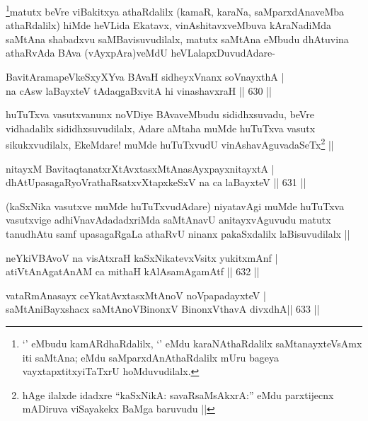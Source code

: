 \begin{artha}
\footnote{`\stext' eMbudu kamARdhaRdalilx, `\stext' eMdu karaNAthaRdalilx saMtanayxteV\s sAmx iti saMtAna; eMdu saMparxdAnAthaRdalilx mUru bageya vayxtapxtitxyiTaTxrU hoMduvudilalx.}matutx beVre viBakitxya athaRdalilx (kamaR, karaNa, saMparxdAnaveMba athaRdalilx) hiMde heVLida Ekatavx, vinAshitavxveMbuva kAraNadiMda saMtAna shabadxvu saMBavisuvudilalx, matutx saMtAna eMbudu dhAtuvina athaRvAda BAva (vAyxpAra)veMdU heVLalapxDuvudAdare-
\end{artha}

\begin{shl}
BavitAramapeVkeSxyXYva BAvaH sidheyxVnanx soV\s nayxthA | \\
na cAsw laBayxteV tAdaqgaBxvitA hi vinashavxraH \hfill||  630 ||  
\end{shl}

\begin{artha}
huTuTxva vasutxvanunx noVDiye BAvaveMbudu sididhxsuvadu, beVre vidhadalilx sididhxsuvudilalx, Adare aMtaha muMde huTuTxva vasutx sikukxvudilalx, EkeMdare! muMde huTuTxvudU vinAshavAguvadaSeTx\footnote{hAge ilalxde idadxre ``kaSxNikA: savaRsaMsAkxrA:'' eMdu parxtijecnx mADiruva viSayakekx BaMga baruvudu ||} ||
\end{artha}

\begin{shl}
nitayxM BavitaqtanatxrXtAvxtasxMtAnasAyxpayxnitayxtA | \\
dhAtUpasagaRyoVrathaRsatxvXtapxkeSxV na ca laBayxteV \hfill||  631 ||  
\end{shl}

\begin{artha}
(kaSxNika vasutxve muMde huTuTxvudAdare) niyatavAgi muMde huTuTxva vasutxvige adhiVnavAdadadxriMda saMtAnavU anitayxvAguvudu matutx tanudhAtu samf upasagaRgaLa athaRvU ninanx pakaSxdalilx laBisuvudilalx ||
\end{artha}


\begin{shl}
neYkiVBAvoV na visAtxraH kaSxNikatevxV\s sitx yukitxmAnf | \\
atiVtAnAgatAnAM ca mithaH kAlAsamAgamAtf \hfill||  632 ||  
\end{shl}
				
\begin{shl}
vataRmAnasayx ceYkatAvxtasxMtAnoV noVpapadayxteV | \\
saMtAniBayxshacx saMtAnoV\s BinonxV BinonxV\s thavA divxdhA\hfill ||  633 ||  
\end{shl}

